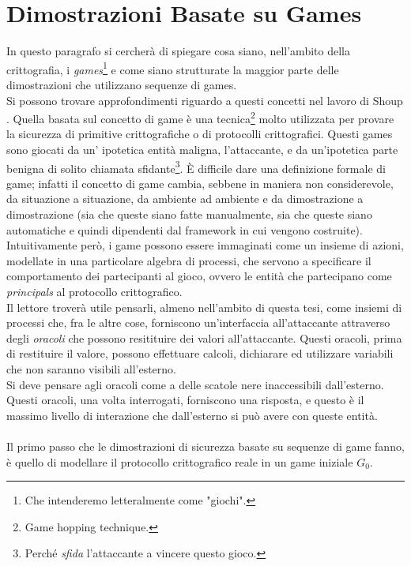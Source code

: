 \documentclass[a4paper,openright,twoside,12pt]{report}
\begin{document}
\section{Dimostrazioni Basate su Games}
In questo paragrafo si cercher\`a di spiegare cosa siano, nell'ambito della crittografia, i \emph{games}\footnote{Che intenderemo letteralmente come "giochi".} e come siano strutturate la
maggior parte delle dimostrazioni che utilizzano sequenze di games.\\Si possono trovare approfondimenti riguardo a questi concetti nel lavoro di Shoup \cite{shoup}.
Quella basata sul concetto di game \`e una tecnica\footnote{Game hopping technique.} molto utilizzata per provare la sicurezza di primitive crittografiche o di protocolli crittografici.
Questi games sono giocati da un' ipotetica entit\`a maligna, l'attaccante, e da un'ipotetica parte benigna di solito chiamata sfidante\footnote{Perch\'e \emph{sfida} l'attaccante a 
vincere questo gioco.}. 
\`E difficile dare una definizione formale di game; infatti il concetto di game cambia, sebbene in maniera non considerevole, da situazione a situazione, da ambiente ad ambiente e 
da dimostrazione a dimostrazione (sia che queste siano fatte manualmente, sia che queste siano automatiche e quindi dipendenti dal framework in cui vengono costruite).
Intuitivamente per\`o, i game possono essere immaginati come un insieme di azioni, modellate in una particolare algebra di processi, 
che servono a specificare il comportamento dei partecipanti al gioco, ovvero le entit\`a che partecipano come \emph{principals} al protocollo crittografico.\\
Il lettore trover\`a utile pensarli, almeno nell'ambito di questa tesi, come insiemi di processi che, fra le altre cose, forniscono un'interfaccia all'attaccante attraverso degli 
\emph{oracoli} che possono resitituire dei valori all'attaccante. Questi oracoli, prima di restituire il valore, possono effettuare calcoli, dichiarare ed utilizzare variabili che non saranno
visibili all'esterno.\\Si deve pensare agli oracoli come a delle scatole nere inaccessibili dall'esterno. Questi oracoli, una volta interrogati, forniscono una risposta,
e questo \`e il massimo livello di interazione che dall'esterno si pu\`o avere con queste entit\`a.\\ \\
Il primo passo che le dimostrazioni di sicurezza basate su sequenze di game fanno, \`e quello di modellare il protocollo crittografico reale in un game iniziale $G_0$.
\end{document}
